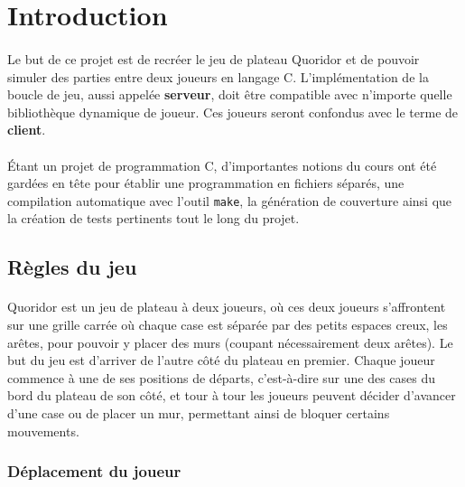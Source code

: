 \documentclass[a4paper]{article}
\begin{document}
\tableofcontents

\newpage

\section{Introduction}

\paragraph{}
Le but de ce projet\cite{sujet} est de recréer le jeu de plateau Quoridor et de pouvoir simuler des parties entre deux joueurs en langage C. L'implémentation de la boucle de jeu, aussi appelée \textbf{serveur}, doit être compatible avec n'importe quelle bibliothèque dynamique de joueur. Ces joueurs seront confondus avec le terme de \textbf{client}.

\paragraph{}
Étant un projet de programmation C, d'importantes notions du cours\cite{cours} ont été gardées en tête pour établir une programmation en fichiers séparés, une compilation automatique avec l'outil \texttt{make}, la génération de couverture ainsi que la création de tests pertinents tout le long du projet.

\subsection{Règles du jeu}
\paragraph{}
Quoridor est un jeu de plateau à deux joueurs, où ces deux joueurs s'affrontent sur une grille carrée où chaque case est séparée par des petits espaces creux, les arêtes, pour pouvoir y placer des murs (coupant nécessairement deux arêtes). Le but du jeu est d'arriver de l'autre côté du plateau en premier. Chaque joueur commence à une de ses positions de départs, c'est-à-dire sur une des cases du bord du plateau de son côté, et tour à tour les joueurs peuvent décider d'avancer d'une case ou de placer un mur, permettant ainsi de bloquer certains mouvements.

\subsubsection{Déplacement du joueur}
\end{document}
